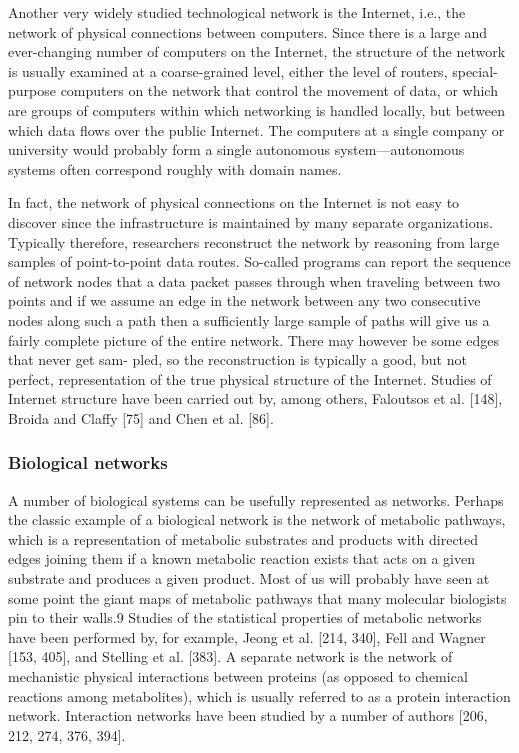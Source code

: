       Another very widely studied technological network is the Internet, i.e., the network of physical connections between computers. Since there is a large and ever-changing number of computers on the Internet, the structure of the network is usually examined at a coarse-grained level, either the level of routers, special-purpose computers on the network that control the movement of data, or  which are groups of computers within which networking is handled locally, but between which data flows over the public Internet. The computers at a single company or university would probably form a single autonomous system—autonomous systems often correspond roughly with domain names.
      
      In fact, the network of physical connections on the Internet is not easy to discover since the infrastructure is maintained by many separate organizations. Typically therefore, researchers reconstruct the network by reasoning from large samples of point-to-point data routes. So-called  programs can report the sequence of network nodes that a data packet passes through when traveling between two points and if we assume an edge in the network between any two consecutive nodes along such a path then a sufficiently large sample of paths will give us a fairly complete picture of the entire network. There may however be some edges that never get sam- pled, so the reconstruction is typically a good, but not perfect, representation of the true physical structure of the Internet. Studies of Internet structure have been carried out by, among others, Faloutsos et al. [148], Broida and Claffy [75] and Chen et al. [86].
      
    \subsubsection{Biological networks}
    
      A number of biological systems can be usefully represented as networks. Perhaps the classic example of a biological network is the network of metabolic pathways, which is a representation of metabolic substrates and products with directed edges joining them if a known metabolic reaction exists that acts on a given substrate and produces a given product. Most of us will probably have seen at some point the giant maps of metabolic pathways that many molecular biologists pin to their walls.9 Studies of the statistical properties of metabolic networks have been performed by, for example, Jeong et al. [214, 340], Fell and Wagner [153, 405], and Stelling et al. [383]. A separate network is the network of mechanistic physical interactions between proteins (as opposed to chemical reactions among metabolites), which is usually referred to as a protein interaction network. Interaction networks have been studied by a number of authors [206, 212, 274, 376, 394].
      
